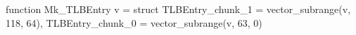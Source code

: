 function Mk_TLBEntry v = struct { TLBEntry_chunk_1 = vector_subrange(v, 118, 64), TLBEntry_chunk_0 = vector_subrange(v, 63, 0) }
